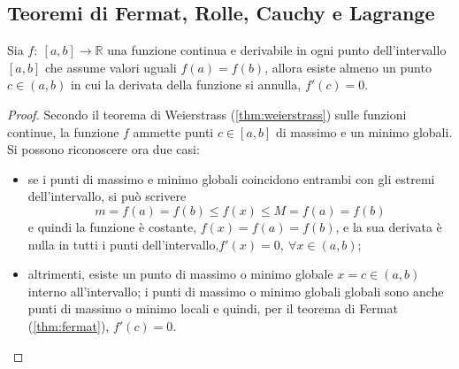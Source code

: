 \subsection{Teoremi di Fermat, Rolle, Cauchy e Lagrange}
\begin{theorem}\label{thm:rolle} Sia $f: \ [a,b] \rightarrow \mathbb{R}$ una funzione continua e derivabile in ogni punto dell'intervallo $[a,b]$ che assume valori uguali $f(a) = f(b)$, allora esiste almeno un punto $c \in (a,b)$ in cui la derivata della funzione si annulla, $f'(c) = 0$.
\end{theorem}
\begin{proof}
    Secondo il teorema di Weierstrass (\ref{thm:weierstrass}) sulle funzioni continue, la funzione $f$ ammette punti $c \in [a,b]$ di massimo e un minimo globali. Si possono riconoscere ora due casi:
    \begin{itemize}
        \item se i punti di massimo e minimo globali coincidono entrambi con gli estremi dell'intervallo, si può scrivere
            \begin{equation} m = f(a) = f(b) \le f(x) \le M = f(a) = f(b) \end{equation}
                e quindi la funzione è costante, $f(x) = f(a) = f(b)$, e la sua derivata è nulla in tutti i punti dell'intervallo,$f'(x) = 0, \ \forall x \in (a,b)$;
            \item altrimenti, esiste un punto di massimo o minimo globale $x=c \in (a,b)$ interno all'intervallo; i punti di massimo o minimo globali globali sono anche punti di massimo o minimo locali e quindi, per il teorema di Fermat (\ref{thm:fermat}), $f'(c) = 0$.
    \end{itemize} 
\end{proof}

